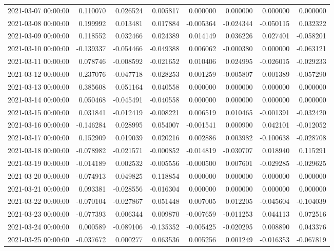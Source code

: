 \begin{tabular}{lrrrrrrr}
2021-03-07 00:00:00 & 0.110070 & 0.026524 & 0.005817 & 0.000000 & 0.000000 & 0.000000 & 0.000000 \\
2021-03-08 00:00:00 & 0.199992 & 0.013481 & 0.017884 & -0.005364 & -0.024344 & -0.050115 & 0.032322 \\
2021-03-09 00:00:00 & 0.118552 & 0.032466 & 0.024389 & 0.014149 & 0.036226 & 0.027401 & -0.058201 \\
2021-03-10 00:00:00 & -0.139337 & -0.054466 & -0.049388 & 0.006062 & -0.000380 & 0.000000 & -0.063121 \\
2021-03-11 00:00:00 & 0.078746 & -0.008592 & -0.021652 & 0.010406 & 0.024995 & -0.026015 & -0.029233 \\
2021-03-12 00:00:00 & 0.237076 & -0.047718 & -0.028253 & 0.001259 & -0.005807 & 0.001389 & -0.057290 \\
2021-03-13 00:00:00 & 0.385608 & 0.051164 & 0.040558 & 0.000000 & 0.000000 & 0.000000 & 0.000000 \\
2021-03-14 00:00:00 & 0.050468 & -0.045491 & -0.040558 & 0.000000 & 0.000000 & 0.000000 & 0.000000 \\
2021-03-15 00:00:00 & 0.031841 & -0.012419 & -0.008221 & 0.006519 & 0.010465 & -0.001391 & -0.032420 \\
2021-03-16 00:00:00 & -0.146284 & 0.028995 & 0.054007 & -0.001541 & 0.000900 & 0.042101 & -0.012052 \\
2021-03-17 00:00:00 & 0.152909 & 0.019039 & 0.020216 & 0.002886 & 0.003982 & -0.100638 & -0.028708 \\
2021-03-18 00:00:00 & -0.078982 & -0.021571 & -0.000852 & -0.014819 & -0.030707 & 0.018940 & 0.115291 \\
2021-03-19 00:00:00 & -0.014189 & 0.002532 & -0.005556 & -0.000500 & 0.007601 & -0.029285 & -0.029625 \\
2021-03-20 00:00:00 & -0.074913 & 0.049825 & 0.118854 & 0.000000 & 0.000000 & 0.000000 & 0.000000 \\
2021-03-21 00:00:00 & 0.093381 & -0.028556 & -0.016304 & 0.000000 & 0.000000 & 0.000000 & 0.000000 \\
2021-03-22 00:00:00 & -0.070104 & -0.027867 & 0.051448 & 0.007005 & 0.012205 & -0.045604 & -0.104039 \\
2021-03-23 00:00:00 & -0.077393 & 0.006344 & 0.009870 & -0.007659 & -0.011253 & 0.044113 & 0.072516 \\
2021-03-24 00:00:00 & 0.000589 & -0.089106 & -0.135352 & -0.005425 & -0.020295 & 0.008890 & 0.043376 \\
2021-03-25 00:00:00 & -0.037672 & 0.000277 & 0.063536 & 0.005256 & 0.001249 & -0.016353 & -0.067819 \\

\end{tabular}
